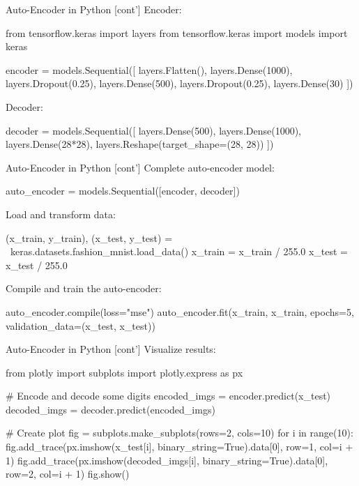 \documentclass[ignorenonframetext,xcolor=x11names]{beamer}
\begin{document}
\begin{frame}[fragile]{Auto-Encoder in Python \small [cont']}
Encoder:
\begin{pythoncode}
from tensorflow.keras import layers
from tensorflow.keras import models
import keras

encoder = models.Sequential([
    layers.Flatten(),
    layers.Dense(1000),
    layers.Dropout(0.25),
    layers.Dense(500),
    layers.Dropout(0.25),
    layers.Dense(30)
])
\end{pythoncode}
Decoder:
\begin{pythoncode}
decoder = models.Sequential([
    layers.Dense(500),
    layers.Dense(1000),
    layers.Dense(28*28),
    layers.Reshape(target_shape=(28, 28))
])
\end{pythoncode}
\end{frame}

\begin{frame}[fragile]{Auto-Encoder in Python \small [cont']}
Complete auto-encoder model:

\begin{pythoncode}
auto_encoder = models.Sequential([encoder, decoder])
\end{pythoncode}

Load and transform data:
\begin{pythoncode}
(x_train, y_train), (x_test, y_test) = \
                    keras.datasets.fashion_mnist.load_data()
x_train = x_train / 255.0
x_test = x_test / 255.0
\end{pythoncode}

Compile and train the auto-encoder:
\begin{pythoncode}
auto_encoder.compile(loss="mse")
auto_encoder.fit(x_train, x_train, 
                 epochs=5, validation_data=(x_test, x_test))
\end{pythoncode}
\end{frame}

\begin{frame}[fragile]{Auto-Encoder in Python \small [cont']}
Visualize results:

\begin{pythoncode}
from plotly import subplots
import plotly.express as px

# Encode and decode some digits
encoded_imgs = encoder.predict(x_test)
decoded_imgs = decoder.predict(encoded_imgs)

# Create plot
fig = subplots.make_subplots(rows=2, cols=10)
for i in range(10):
    fig.add_trace(px.imshow(x_test[i], 
        binary_string=True).data[0], 
        row=1, col=i + 1)
    fig.add_trace(px.imshow(decoded_imgs[i], 
        binary_string=True).data[0], 
        row=2, col=i + 1)
fig.show()
\end{pythoncode}
\end{frame}
\end{document}
